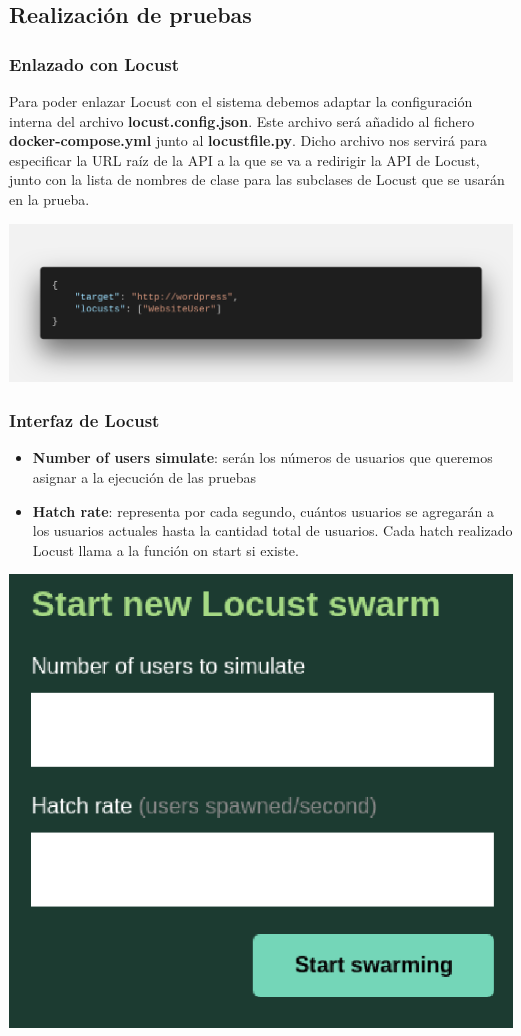 \documentclass{beamer}
\theoremstyle{plain}
\theoremstyle{definition}
\theoremstyle{plain}
\theoremstyle{definition}
\theoremstyle{remark}
\theoremstyle{definition}
\begin{document}
\subsection{Realización de pruebas}
\begin{frame}
	\frametitle{Enlazado con Locust}
	Para poder enlazar Locust con el sistema debemos adaptar la configuración interna del archivo \textbf{locust.config.json}. Este archivo será añadido al fichero \textbf{docker-compose.yml} junto al \textbf{locustfile.py}.
	Dicho archivo nos servirá para especificar la URL raíz de la API a la que se va a redirigir la API de Locust, junto con la lista de nombres de clase para las subclases de Locust que se usarán en la prueba.

	\centering
	\includegraphics[scale=0.15]{imagenes/jsonLocust.png}
	\end{frame}
\begin{frame}
\frametitle{Interfaz de Locust}
\begin{itemize}			
	\item \textbf{Number of users simulate}: serán los números de usuarios que queremos asignar a la ejecución de las pruebas
	\item \textbf{Hatch rate}: representa por cada segundo, cuántos usuarios se agregarán a los usuarios actuales hasta la cantidad total de usuarios. Cada hatch realizado Locust llama a la función on start si existe.
\end{itemize}
	
	\centering
	\includegraphics[scale=0.1]{imagenes/locustInterfaz.png}
\end{frame}
\end{document}
